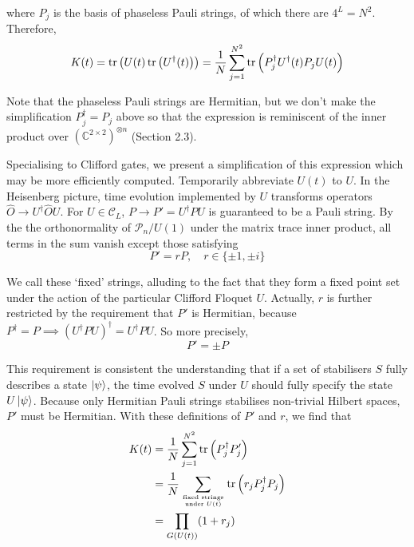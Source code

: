 \documentclass[10pt]{article}
\begin{document}
where $P_j$ is the basis of phaseless Pauli strings, of which there are $4^L = N^2$. Therefore,
\begin{equation}
K(t) =
\trace \left( U(t) \trace \left( U^\dagger(t) \right) \right) = \frac{1}{N} \sum_{j=1}^{N^2} \trace \left( P^\dagger_{j} U^\dagger(t) P_j U(t) \right)
\end{equation}

Note that the phaseless Pauli strings are Hermitian, but we don't make the simplification $P_j^\dagger = P_j$ above so that the expression is reminiscent of the inner product over $(\mathbb{C}^{2\times2})^{\otimes n}$ (Section 2.3).


Specialising to Clifford gates, we present a simplification of this expression which may be more efficiently computed. Temporarily abbreviate $U(t)$ to $U$. In the Heisenberg picture, time evolution implemented by $U$ transforms operators $\hat{O} \rightarrow U^\dagger \hat{O} U$. For $U \in \mathcal{C}_L$, $P \rightarrow P' = U^\dagger P U$ is guaranteed to be a Pauli string. By the the orthonormality of $\mathcal{P}_n / U(1)$ under the matrix trace inner product, all terms in the sum vanish except those satisfying
\begin{equation}
P' = r P, \quad r \in \{\pm1, \pm i\}
\end{equation} 

We call these `fixed' strings, alluding to the fact that they form a fixed point set under the action of the particular Clifford Floquet $U$. Actually, $r$ is further restricted by the requirement that $P'$ is Hermitian, because $P^\dagger = P \implies (U^\dagger P U)^\dagger = U^\dagger P U$. So more precisely,
\begin{equation}
P' = \pm P
\end{equation} 

This requirement is consistent the understanding that if a set of stabilisers $S$ fully describes a state $\ket{\psi}$, the time evolved $S$ under $U$ should fully specify the state $U\ket{\psi}$. Because only Hermitian Pauli strings stabilises non-trivial Hilbert spaces, $P'$ must be Hermitian. With these definitions of $P'$ and $r$, we find that
\begin{align}
K(t) 
&= \frac{1}{N} \sum_{j=1}^{N^2} \trace \left(P^\dagger_j P'_j\right) \\
&= \frac{1}{N} \sum_{\text{fixed strings} \atop \text{under } U(t)} \trace \left(r_j P^\dagger_j P_j\right) \\
&= \prod_{G(U(t))} (1+r_j)
\end{align}
\end{document}
